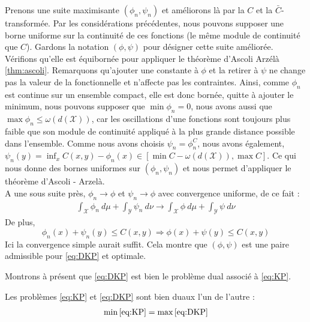 \documentclass[a4paper,12pt]{article}
\begin{document}
\begin{preuve}
Prenons une suite maximisante $(\phi_n,\psi_n)$ et améliorons là par la $C$ et la $\bar{C}$-transformée. Par les considérations précédentes, nous pouvons supposer une borne uniforme sur la continuité de ces fonctions (le même module de continuité que $C$). Gardons la notation $(\phi,\psi)$  pour désigner cette suite améliorée. \\
Vérifions qu'elle est équibornée pour appliquer le théorème d'Ascoli Arzélà \eqref{thm:ascoli}. Remarquons qu'ajouter une constante à $\phi$ et la retirer à $\psi$ ne change pas la valeur de la fonctionnelle et n'affecte pas les contraintes. Ainsi, comme $\phi_n$ est continue sur un ensemble compact, elle est donc bornée, quitte à ajouter le minimum, nous pouvons supposer que $\min \phi_n=0$, nous avons aussi que $\max \phi_n \leq \omega (d(\mathcal{X}))$, car les oscillations d'une fonctions sont toujours plus faible que son module de continuité appliqué à la plus grande distance possible dans l'ensemble.
Comme nous avons choisis $\psi_n=\phi_n^C$, nous avons également, $\psi_n(y)=\inf_xC(x,y)-\phi_n(x)\in[\min C- \omega (d(\mathcal{X})),\max C]$. Ce qui nous donne des bornes uniformes sur $(\phi_n,\psi_n)$ et nous permet d'appliquer le théorème d'Ascoli - Arzelà.\\
A une sous suite près, $\phi_n\rightarrow\phi$ et $\psi_n\rightarrow\phi$ avec convergence uniforme, de ce fait : 
\begin{align}
\int_{\mathcal{X}}\phi_n\ d\mu + \int_{\mathcal{Y}}\psi_n\ d\nu \rightarrow \int_{\mathcal{X}}\phi\ d\mu + \int_{\mathcal{Y}}\psi\ d\nu
\end{align}
De plus, 
$$
\phi_n(x)+\psi_n(y)\leq C(x,y) \Rightarrow \phi(x)+\psi(y)\leq C(x,y)
$$
Ici la convergence simple aurait suffit. Cela montre que $(\phi,\psi)$ est une paire admissible pour \eqref{eq:DKP} et optimale.
\end{preuve}
Montrons à présent que \eqref{eq:DKP} est bien le problème dual associé à \eqref{eq:KP}. 
\begin{theoreme}{}
Les problèmes \eqref{eq:KP} et \eqref{eq:DKP} sont bien duaux l'un de l'autre :
\begin{align}
\min\eqref{eq:KP} = \max\eqref{eq:DKP}
\end{align}
\end{theoreme}
\end{document}

